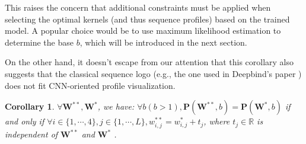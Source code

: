 \documentclass[12pt]{article}
\newcommand{\matrixSymbol}[1]{\mathbf{#1}}
\newtheorem{corollary}{Corollary}
\begin{document}




This raises the concern that additional constraints must be applied when selecting the optimal kernels (and thus sequence profiles) based on the trained model. A popular choice would be to use maximum likelihood estimation to determine the base $b$, which will be introduced in the next section.

On the other hand, it doesn’t escape from our attention that this corollary also suggests that the classical sequence logo (e.g., the one used in Deepbind's paper \cite{alipanahi_predicting_2015} ) does not fit CNN-oriented profile visualization.

\begin{corollary}
$\forall \matrixSymbol{W}^{**}, \matrixSymbol{W}^{*} $, we have: $\forall b (b > 1), \matrixSymbol{P}(\matrixSymbol{W}^{**}, b) = \matrixSymbol{P}(\matrixSymbol{W}^{*}, b)$  if and only if $\forall i \in \{1, \cdots, 4\}, j \in \{1, \cdots, L\}, w^{**}_{i,j} = w^{*}_{i, j} + t_{j} $, where $t_{j} \in \mathbb{R}$ is independent of $\matrixSymbol{W}^{**}$ and $ \matrixSymbol{W}^{*} $ .
\end{corollary}
\end{document}
